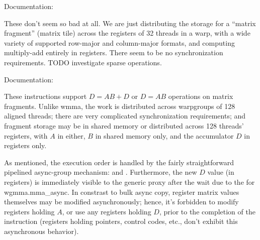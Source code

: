 \filbreak
{}

Documentation: 

These don't seem so bad at all. We are just distributing the storage for a ``matrix fragment'' (matrix tile) across the registers of 32 threads in a warp, with a wide variety of supported row-major and column-major formats, and computing multiply-add entirely in registers. There seem to be no synchronization requirements. TODO investigate sparse operations.

\filbreak
{}

Documentation: 

These  instructions support $D = AB + D$ or $D = AB$ operations on matrix fragments. Unlike wmma, the work is distributed across warpgroups of 128 aligned threads; there are very complicated synchronization requirements; and fragment storage may be in shared memory or distributed across 128 threads' registers, with $A$ in either, $B$ in shared memory only, and the accumulator $D$ in registers only.

\filbreak
As mentioned, the execution order is handled by the fairly straightforward pipelined async-group mechanism:  and . Furthermore, the new $D$ value (in registers) is immediately visible to the generic proxy after the wait due to the  for wgmma.mma\_async. In constrast to bulk async copy, register matrix values themselves may be modified asynchronously; hence, it's forbidden to modify registers holding $A$, or use any registers holding $D$, prior to the completion of the instruction (registers holding pointers, control codes, etc., don't exhibit this asynchronous behavior).

